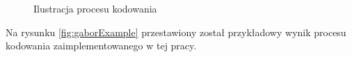 \begin{figure}[!ht]
  \centering
  \caption{Ilustracja procesu kodowania}
  \label{fig:gaborEncoding}
\end{figure}

Na rysunku \ref{fig:gaborExample} przestawiony został przykładowy wynik procesu kodowania zaimplementowanego
w tej pracy.

